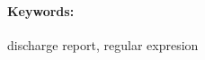 \documentclass[12pt, twoside]{book}
\begin{document}
\paragraph*{Keywords:} discharge report, regular expresion


%
%
%



\newpage 

\tableofcontents



\newpage 

\listoffigures


\mainmatter
\pagestyle{headings}


 

%





%













\newpage	

\backmatter

\thispagestyle{empty}
\clearpage


 




%



\end{document}

